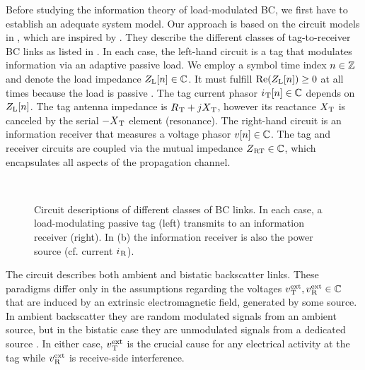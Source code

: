 Before studying the information theory of load-modulated BC, we first have to establish an adequate system model. Our approach is based on the circuit models in , which are inspired by \cite{Finkenzeller2015}. They describe the different classes of tag-to-receiver BC links as listed in \cite[Fig.~2]{HuynhCST2018}.
In each case, the left-hand circuit is a tag that modulates information via an adaptive passive load. We employ a symbol time index $n \in \mathbb{Z}$ and denote the load impedance $Z_\mathrm{L}[n] \in \mathbb{C}$. It must fulfill $\mathrm{Re}(Z_\mathrm{L}[n]) \geq 0$ at all times because the load is passive \cite[Sec.~4.1]{Pozar2004}.
The tag current phasor $i_{\hspace{.2mm}\mathrm{T}}[n] \in \mathbb{C}$ depends on $Z_\mathrm{L}[n]$. The tag antenna impedance is $R_{\hspace{.2mm}\mathrm{T}} + jX_{\hspace{.2mm}\mathrm{T}}$, however its reactance $X_{\hspace{.2mm}\mathrm{T}}$ is canceled by the serial $-X_{\hspace{.2mm}\mathrm{T}}$ element (resonance). The right-hand circuit is an information receiver that measures a voltage phasor $v[n] \in \mathbb{C}$. The tag and receiver circuits are coupled via the mutual impedance $Z_{\hspace{.2mm}\mathrm{RT}} \in \mathbb{C}$, which encapsulates all aspects of the propagation channel.

\begin{figure}[!ht]
\centering
{}\\[5mm]
\caption{Circuit descriptions of different classes of BC links. In each case, a load-modulating passive tag (left) transmits to an information receiver (right). %
In (b) the information receiver is also the power source (cf. current $i_{\hspace{.2mm}\mathrm{R}}$).}
\label{fig:SystemModelCircuit}
\end{figure}

The circuit  describes both ambient and bistatic backscatter links. These paradigms differ only in the assumptions regarding the voltages
$v^\mathrm{ext}_{\hspace{.2mm}\mathrm{T}} , v^\mathrm{ext}_{\hspace{.2mm}\mathrm{R}} \in \mathbb{C}$
that are induced by an extrinsic electromagnetic field, generated by some source. In ambient backscatter they are random modulated signals from an ambient source, but in the bistatic case they are unmodulated signals from a dedicated source \cite{HuynhCST2018}. %
In either case, $v^\mathrm{ext}_{\hspace{.2mm}\mathrm{T}}$ is the crucial cause for any electrical activity at the tag while $v^\mathrm{ext}_{\hspace{.2mm}\mathrm{R}}$ is receive-side interference.

